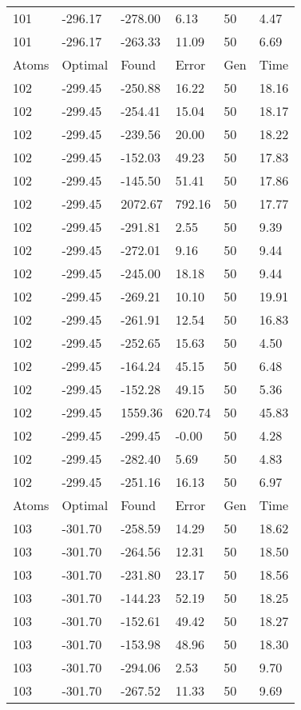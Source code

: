 \documentclass{report}
\begin{document}
\begin{appendix}
\begin{longtable}{llllll}
101 & -296.17 & -278.00 & 6.13 & 50 & 4.47 \\
101 & -296.17 & -263.33 & 11.09 & 50 & 6.69 \\
Atoms & Optimal & Found & Error & Gen & Time \\
102 & -299.45 & -250.88 & 16.22 & 50 & 18.16 \\
102 & -299.45 & -254.41 & 15.04 & 50 & 18.17 \\
102 & -299.45 & -239.56 & 20.00 & 50 & 18.22 \\
102 & -299.45 & -152.03 & 49.23 & 50 & 17.83 \\
102 & -299.45 & -145.50 & 51.41 & 50 & 17.86 \\
102 & -299.45 & 2072.67 & 792.16 & 50 & 17.77 \\
102 & -299.45 & -291.81 & 2.55 & 50 & 9.39 \\
102 & -299.45 & -272.01 & 9.16 & 50 & 9.44 \\
102 & -299.45 & -245.00 & 18.18 & 50 & 9.44 \\
102 & -299.45 & -269.21 & 10.10 & 50 & 19.91 \\
102 & -299.45 & -261.91 & 12.54 & 50 & 16.83 \\
102 & -299.45 & -252.65 & 15.63 & 50 & 4.50 \\
102 & -299.45 & -164.24 & 45.15 & 50 & 6.48 \\
102 & -299.45 & -152.28 & 49.15 & 50 & 5.36 \\
102 & -299.45 & 1559.36 & 620.74 & 50 & 45.83 \\
102 & -299.45 & -299.45 & -0.00 & 50 & 4.28 \\
102 & -299.45 & -282.40 & 5.69 & 50 & 4.83 \\
102 & -299.45 & -251.16 & 16.13 & 50 & 6.97 \\
Atoms & Optimal & Found & Error & Gen & Time \\
103 & -301.70 & -258.59 & 14.29 & 50 & 18.62 \\
103 & -301.70 & -264.56 & 12.31 & 50 & 18.50 \\
103 & -301.70 & -231.80 & 23.17 & 50 & 18.56 \\
103 & -301.70 & -144.23 & 52.19 & 50 & 18.25 \\
103 & -301.70 & -152.61 & 49.42 & 50 & 18.27 \\
103 & -301.70 & -153.98 & 48.96 & 50 & 18.30 \\
103 & -301.70 & -294.06 & 2.53 & 50 & 9.70 \\
103 & -301.70 & -267.52 & 11.33 & 50 & 9.69 \\

\end{longtable}
\end{appendix}
\end{document}
